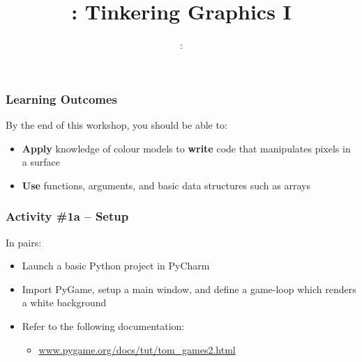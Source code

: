 \usepackage{../../beamerthemeFalmouthGamesAcademy}
\usepackage{multimedia}
\graphicspath{ {../../} }


\usepackage[normalem]{ulem}
\usepackage{wasysym}

\usepackage{pdfpages}

\usetikzlibrary{arrows,automata}







\title{\sessionnumber: Tinkering Graphics I}
\subtitle{\modulecode: \moduletitle}

\frame{\titlepage} 

\begin{frame}
	\frametitle{Learning Outcomes}
	By the end of this workshop, you should be able to:	
	\begin{itemize}
		\item \textbf{Apply} knowledge of colour models to \textbf{write} code that manipulates pixels in a surface
		\item \textbf{Use} functions, arguments, and basic data structures such as arrays
	\end{itemize}
\end{frame}

\begin{frame}
	\frametitle{Activity \#1a -- Setup}
	
	In pairs:
	
	\vspace{2em}
	
	\begin{itemize}		
		\item Launch a basic Python project in PyCharm
		\item Import PyGame, setup a main window, and define a game-loop which renders a white background
		\item Refer to the following documentation:
		\begin{itemize}
			\item \url{www.pygame.org/docs/tut/tom_games2.html}
		\end{itemize}
	\end{itemize}
\end{frame}

